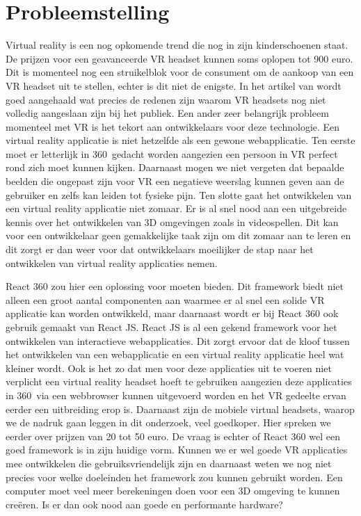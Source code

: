 \section{Probleemstelling}
\label{sec:probleemstelling}

Virtual reality is een nog opkomende trend die nog in zijn kinderschoenen staat. De prijzen voor een geavanceerde VR headset kunnen soms oplopen tot 900 euro. Dit is momenteel nog een struikelblok voor de consument om de aankoop van een VR  headset uit te stellen, echter is dit niet de enigste. In het artikel van \autocite{Abarrera2017} wordt goed aangehaald wat precies de redenen zijn waarom VR headsets nog niet volledig aangeslaan zijn bij het publiek. Een ander zeer belangrijk probleem momenteel met VR is het tekort aan ontwikkelaars voor deze technologie. Een virtual reality applicatie is niet hetzelfde als een gewone webapplicatie. Ten eerste moet er letterlijk in 360\textdegree\  gedacht worden aangezien een persoon in VR perfect rond zich moet kunnen kijken. Daarnaast mogen we niet vergeten dat bepaalde beelden die ongepast zijn voor VR een negatieve weerslag kunnen geven aan de gebruiker en zelfs kan leiden tot fysieke pijn. Ten slotte gaat het ontwikkelen van een virtual reality applicatie niet zomaar. Er is al snel nood aan een uitgebreide kennis over het ontwikkelen van 3D omgevingen zoals in videospellen. Dit kan voor een ontwikkelaar geen gemakkelijke taak zijn om dit zomaar aan te leren en dit zorgt er dan weer voor dat ontwikkelaars moeilijker de stap naar het ontwikkelen van virtual reality applicaties nemen.

React 360 zou hier een oplossing voor moeten bieden. Dit framework biedt niet alleen een groot aantal componenten aan waarmee er al snel een solide VR applicatie kan worden ontwikkeld, maar daarnaast wordt er bij React 360 ook gebruik gemaakt van React JS. React JS is al een gekend framework voor het ontwikkelen van interactieve webapplicaties. Dit zorgt ervoor dat de kloof tussen het ontwikkelen van een webapplicatie en een virtual reality applicatie heel wat kleiner wordt. Ook is het zo dat men voor deze applicaties uit te voeren niet verplicht een virtual reality headset hoeft te gebruiken aangezien deze applicaties in 360\textdegree\ via een webbrowser kunnen uitgevoerd worden en het VR gedeelte ervan eerder een uitbreiding erop is. Daarnaast zijn de mobiele virtual headsets, waarop we de nadruk gaan leggen in dit onderzoek, veel goedkoper. Hier spreken we eerder over prijzen van 20 tot 50 euro. De vraag is echter of React 360 wel een goed framework is in zijn huidige vorm. Kunnen we er wel goede VR applicaties mee ontwikkelen die gebruiksvriendelijk zijn en daarnaast weten we nog niet precies voor welke doeleinden het framework zou kunnen gebruikt worden. Een computer moet veel meer berekeningen doen voor een 3D omgeving te kunnen creëren. Is er dan ook nood aan goede en performante hardware? 


